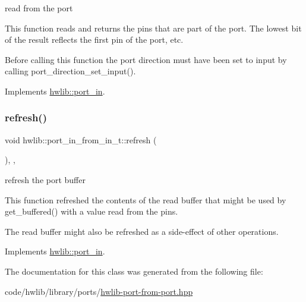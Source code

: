 read from the port

This function reads and returns the pins that are part of the port. The lowest bit of the result reflects the first pin of the port, etc.

Before calling this function the port direction must have been set to input by calling port\+\_\+direction\+\_\+set\+\_\+input(). 

Implements \hyperlink{classhwlib_1_1port__in_aa3aa277f9448c3ee493c56f05beb2ddb}{hwlib\+::port\+\_\+in}.

\mbox{\label{classhwlib_1_1port__in__from__in__t_a44f91dea24d3a938b28a35c05249fcd9}} 
\subsubsection{\texorpdfstring{refresh()}{refresh()}}
{\footnotesize\ttfamily void hwlib\+::port\+\_\+in\+\_\+from\+\_\+in\+\_\+t\+::refresh (\begin{DoxyParamCaption}{ }\end{DoxyParamCaption})\hspace{0.3cm}{\ttfamily [inline]}, {\ttfamily [override]}, {\ttfamily [virtual]}}





refresh the port buffer

This function refreshed the contents of the read buffer that might be used by get\+\_\+buffered() with a value read from the pins.

The read buffer might also be refreshed as a side-\/effect of other operations. 

Implements \hyperlink{classhwlib_1_1port__in_a5d409eee35b766c844f7229fbe010545}{hwlib\+::port\+\_\+in}.



The documentation for this class was generated from the following file\+:\begin{DoxyCompactItemize}
\item 
code/hwlib/library/ports/\hyperlink{hwlib-port-from-port_8hpp}{hwlib-\/port-\/from-\/port.\+hpp}\end{DoxyCompactItemize}
